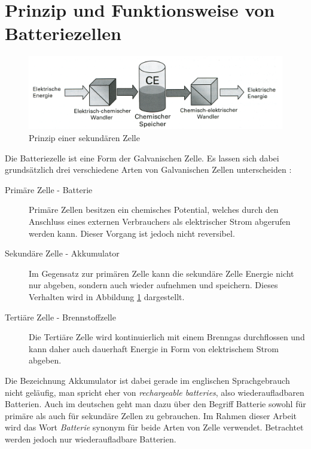 \documentclass[a4paper, 11pt, headsepline,footsepline,twoside,abstract]{scrbook}
\begin{document}
\section{Prinzip und Funktionsweise von Batteriezellen}
\begin{figure}
	\centering
	\includegraphics[width=1.0\columnwidth]{images/Prinzipieller_Aufbau.png}
	\caption{Prinzip einer sekundären Zelle \cite{jossen_2006}}
	\label{Prinzip_Zelle}
\end{figure}
Die Batteriezelle ist eine Form der Galvanischen Zelle. Es lassen sich dabei grundsätzlich drei verschiedene Arten von Galvanischen Zellen unterscheiden \cite{jossen_2006}:
\begin{description}
\item[Primäre Zelle - Batterie] Primäre Zellen besitzen ein chemisches Potential, welches durch den Anschluss eines externen Verbrauchers als elektrischer Strom abgerufen werden kann. Dieser Vorgang ist jedoch nicht reversibel.
\item[Sekundäre Zelle - Akkumulator] Im Gegensatz zur primären Zelle kann die sekundäre Zelle Energie nicht nur abgeben, sondern auch wieder aufnehmen und speichern. Dieses Verhalten wird in Abbildung \ref{Prinzip_Zelle} dargestellt.
\item[Tertiäre Zelle - Brennstoffzelle] Die Tertiäre Zelle wird kontinuierlich mit einem Brenngas durchflossen und kann daher auch dauerhaft Energie in Form von elektrischem Strom abgeben.  
\end{description}
Die Bezeichnung Akkumulator ist dabei gerade im englischen Sprachgebrauch nicht geläufig, man spricht eher von \textit{rechargeable batteries}, also wiederaufladbaren Batterien. Auch im deutschen geht man dazu über den Begriff Batterie sowohl für primäre als auch für sekundäre Zellen zu gebrauchen. Im Rahmen dieser Arbeit wird das Wort \textit{Batterie} synonym für beide Arten von Zelle verwendet. Betrachtet werden jedoch nur wiederaufladbare Batterien.
\end{document}
